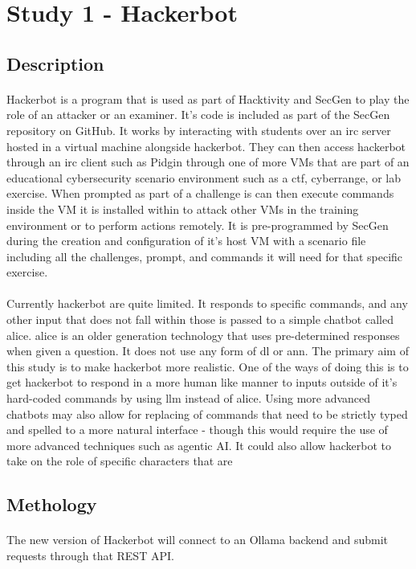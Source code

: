 \section{Study 1 - Hackerbot}
\subsection{Description}

\paragraph{}Hackerbot is a program that is used as part of Hacktivity and SecGen to play the role of an attacker or an examiner. It's code is included as part of the SecGen repository on GitHub. It works by interacting with students over an \acrfull{irc} server hosted in a virtual machine alongside hackerbot. They can then access hackerbot through an \acrshort{irc} client such as Pidgin through one of more \acrshort{VM}s that are part of an educational cybersecurity scenario environment such as a \acrshort{ctf}, cyberrange, or lab exercise. When prompted as part of a challenge is can then execute commands inside the \acrfull{VM} it is installed within to attack other \acrshort{VM}s in the training environment or to perform actions remotely. It is pre-programmed by SecGen during the creation and configuration of it's host \acrlong{VM} with a scenario file including all the challenges, prompt, and commands it will need for that specific exercise.

\paragraph{}Currently hackerbot are quite limited. It responds to specific commands, and any other input that does not fall within those is passed to a simple chatbot called \acrfull{alice}. \acrshort{alice} is an older generation technology that uses pre-determined responses when given a question. It does not use any form of \acrlong{dl} or \acrfull{ann}. The primary aim of this study is to make hackerbot more realistic. One of the ways of doing this is to get hackerbot to respond in a more human like manner to inputs outside of it's hard-coded commands by using \acrshort{llm} instead of \acrshort{alice}. Using more advanced chatbots may also allow for replacing of commands that need to be strictly typed and spelled to a more natural interface - though this would require the use of more advanced techniques such as agentic AI. It could also allow hackerbot to take on the role of specific characters that are 

\subsection{Methology}
\paragraph{}The new version of Hackerbot will connect to an Ollama backend and submit requests through that REST API.